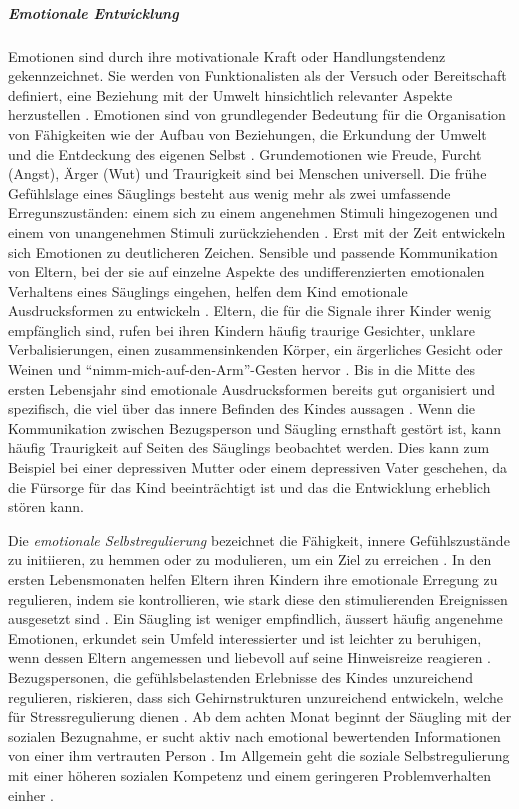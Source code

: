 \subparagraph{Emotionale Entwicklung}\label{par:EmotionaleEntwicklung}
Emotionen sind durch ihre motivationale Kraft oder Handlungstendenz gekennzeichnet. Sie werden von Funktionalisten als der Versuch oder Bereitschaft definiert, eine Beziehung mit der Umwelt hinsichtlich relevanter Aspekte herzustellen \cite[S.~529ff]{Siegler2008}. Emotionen sind von grundlegender Bedeutung für die Organisation von Fähigkeiten wie der Aufbau von Beziehungen, die Erkundung der Umwelt und die Entdeckung des eigenen Selbst \cite{Halle2003, Saarni2006}. Grundemotionen wie Freude, Furcht (Angst), Ärger (Wut) und Traurigkeit sind bei Menschen universell. Die frühe Gefühlslage eines Säuglings besteht aus wenig mehr als zwei umfassende Erregunszuständen: einem sich zu einem angenehmen Stimuli hingezogenen und einem von unangenehmen Stimuli zurückziehenden \cite{Camras2003, Fox1991}. Erst mit der Zeit entwickeln sich Emotionen zu deutlicheren Zeichen. Sensible und passende Kommunikation von Eltern, bei der sie auf einzelne Aspekte des undifferenzierten emotionalen Verhaltens eines Säuglings eingehen, helfen dem Kind emotionale Ausdrucksformen zu entwickeln \cite{Gergely1999}. Eltern, die für die Signale ihrer Kinder wenig empfänglich sind, rufen bei ihren Kindern häufig traurige Gesichter, unklare Verbalisierungen, einen zusammensinkenden Körper, ein ärgerliches Gesicht oder Weinen und \enquote{nimm-mich-auf-den-Arm}-Gesten hervor \cite{Weinberg1994, Yale1999}. Bis in die Mitte des ersten Lebensjahr sind emotionale Ausdrucksformen bereits gut organisiert und spezifisch, die viel über das innere Befinden des Kindes aussagen \cite{Berk2011}. Wenn die Kommunikation zwischen Bezugsperson und Säugling ernsthaft gestört ist, kann häufig Traurigkeit auf Seiten des Säuglings beobachtet werden. Dies kann zum Beispiel bei einer depressiven Mutter oder einem depressiven Vater geschehen, da die Fürsorge für das Kind beeinträchtigt ist und das die Entwicklung erheblich stören kann.

Die \textit{emotionale Selbstregulierung} bezeichnet die Fähigkeit, innere Gefühlszustände zu initiieren, zu hemmen oder zu modulieren, um ein Ziel zu erreichen \cite{Siegler2008}. In den ersten Lebensmonaten helfen Eltern ihren Kindern ihre emotionale Erregung zu regulieren, indem sie kontrollieren, wie stark diese den stimulierenden Ereignissen ausgesetzt sind \cite{Gianino1988}. Ein Säugling ist weniger empfindlich, äussert häufig angenehme Emotionen, erkundet sein Umfeld interessierter und ist leichter zu beruhigen, wenn dessen Eltern angemessen und liebevoll auf seine Hinweisreize reagieren \cite{Crockenberg2004}. Bezugspersonen, die gefühlsbelastenden Erlebnisse des Kindes unzureichend regulieren, riskieren, dass sich Gehirnstrukturen unzureichend entwickeln, welche für Stressregulierung dienen \cite[S.~250]{Berk2011}. Ab dem achten Monat beginnt der Säugling mit der sozialen Bezugnahme, er sucht aktiv nach emotional bewertenden Informationen von einer ihm vertrauten Person \cite{Mumme2007}. Im Allgemein geht die soziale Selbstregulierung mit einer höheren sozialen Kompetenz und einem geringeren Problemverhalten einher \cite[S.~580]{Siegler2008}. 

